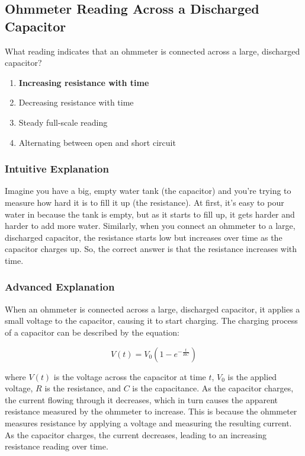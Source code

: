 \subsection{Ohmmeter Reading Across a Discharged Capacitor}
\label{T7D10}

\begin{tcolorbox}[colback=gray!10!white,colframe=black!75!black,title=T7D10]
What reading indicates that an ohmmeter is connected across a large, discharged capacitor?
\begin{enumerate}[label=\Alph*)]
    \item \textbf{Increasing resistance with time}
    \item Decreasing resistance with time
    \item Steady full-scale reading
    \item Alternating between open and short circuit
\end{enumerate}
\end{tcolorbox}

\subsubsection{Intuitive Explanation}
Imagine you have a big, empty water tank (the capacitor) and you’re trying to measure how hard it is to fill it up (the resistance). At first, it’s easy to pour water in because the tank is empty, but as it starts to fill up, it gets harder and harder to add more water. Similarly, when you connect an ohmmeter to a large, discharged capacitor, the resistance starts low but increases over time as the capacitor charges up. So, the correct answer is that the resistance increases with time.

\subsubsection{Advanced Explanation}
When an ohmmeter is connected across a large, discharged capacitor, it applies a small voltage to the capacitor, causing it to start charging. The charging process of a capacitor can be described by the equation:

\[
V(t) = V_0 \left(1 - e^{-\frac{t}{RC}}\right)
\]

where \( V(t) \) is the voltage across the capacitor at time \( t \), \( V_0 \) is the applied voltage, \( R \) is the resistance, and \( C \) is the capacitance. As the capacitor charges, the current flowing through it decreases, which in turn causes the apparent resistance measured by the ohmmeter to increase. This is because the ohmmeter measures resistance by applying a voltage and measuring the resulting current. As the capacitor charges, the current decreases, leading to an increasing resistance reading over time.


